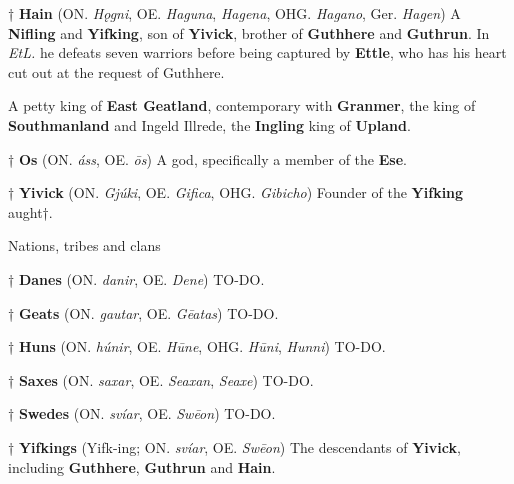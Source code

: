 † \textbf{Hain} (ON. \emph{Hǫgni}, OE. \emph{Haguna}, \emph{Hagena}, OHG. \emph{Hagano}, Ger. \emph{Hagen})
 A \textbf{Nifling} and \textbf{Yifking}, son of \textbf{Yivick}, brother of \textbf{Guthhere} and \textbf{Guthrun}. In \emph{EtL.} he defeats seven warriors before being captured by \textbf{Ettle}, who has his heart cut out at the request of Guthhere.
 
 A petty king of \textbf{East Geatland}, contemporary with \textbf{Granmer}, the king of \textbf{Southmanland} and Ingeld Illrede, the \textbf{Ingling} king of \textbf{Upland}.

† \textbf{Os} (ON. \emph{áss}, OE. \emph{ōs})
 A god, specifically a member of the \textbf{Ese}.

† \textbf{Yivick} (ON. \emph{Gjúki}, OE. \emph{Gifica}, OHG. \emph{Gibicho})
 Founder of the \textbf{Yifking} aught†.

Nations, tribes and clans

† \textbf{Danes} (ON. \emph{danir}, OE. \emph{Dene})
 TO-DO.
 
† \textbf{Geats} (ON. \emph{gautar}, OE. \emph{Gēatas})
 TO-DO.

† \textbf{Huns} (ON. \emph{húnir}, OE. \emph{Hūne}, OHG. \emph{Hūni}, \emph{Hunni})
 TO-DO.

† \textbf{Saxes} (ON. \emph{saxar}, OE. \emph{Seaxan}, \emph{Seaxe})
 TO-DO.

† \textbf{Swedes} (ON. \emph{svíar}, OE. \emph{Swēon})
 TO-DO.
 
† \textbf{Yifkings} (Yifk-ing; ON. \emph{svíar}, OE. \emph{Swēon})
 The descendants of \textbf{Yivick}, including \textbf{Guthhere}, \textbf{Guthrun} and \textbf{Hain}.
